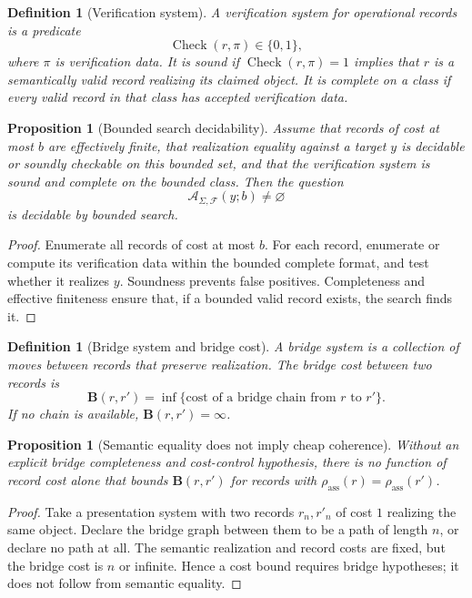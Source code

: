 \documentclass[11pt]{article}
\newtheorem{proposition}[theorem]{Proposition}
\newtheorem{definition}[theorem]{Definition}
\begin{document}
\begin{definition}[Verification system]
A verification system for operational records is a predicate
\[
\operatorname{Check}(r,\pi)\in\{0,1\},
\]
where \(\pi\) is verification data.  It is sound if \(\operatorname{Check}(r,\pi)=1\) implies that \(r\) is a semantically valid record realizing its claimed object.  It is complete on a class if every valid record in that class has accepted verification data.
\end{definition}

\begin{proposition}[Bounded search decidability]
Assume that records of cost at most \(b\) are effectively finite, that realization equality against a target \(y\) is decidable or soundly checkable on this bounded set, and that the verification system is sound and complete on the bounded class.  Then the question
\[
\mathcal A_{\Sigma,\mathcal F}(y;b)\ne\varnothing
\]
is decidable by bounded search.
\end{proposition}

\begin{proof}
Enumerate all records of cost at most \(b\).  For each record, enumerate or compute its verification data within the bounded complete format, and test whether it realizes \(y\).  Soundness prevents false positives.  Completeness and effective finiteness ensure that, if a bounded valid record exists, the search finds it.
\end{proof}

\begin{definition}[Bridge system and bridge cost]
A bridge system is a collection of moves between records that preserve realization.  The bridge cost between two records is
\[
\mathbf B(r,r')
=
\inf\{\text{cost of a bridge chain from }r\text{ to }r'\}.
\]
If no chain is available, \(\mathbf B(r,r')=\infty\).
\end{definition}

\begin{proposition}[Semantic equality does not imply cheap coherence]
Without an explicit bridge completeness and cost-control hypothesis, there is no function of record cost alone that bounds \(\mathbf B(r,r')\) for records with \(\rho_{\operatorname{ass}}(r)=\rho_{\operatorname{ass}}(r')\).
\end{proposition}

\begin{proof}
Take a presentation system with two records \(r_n,r'_n\) of cost \(1\) realizing the same object.  Declare the bridge graph between them to be a path of length \(n\), or declare no path at all.  The semantic realization and record costs are fixed, but the bridge cost is \(n\) or infinite.  Hence a cost bound requires bridge hypotheses; it does not follow from semantic equality.
\end{proof}
\end{document}

